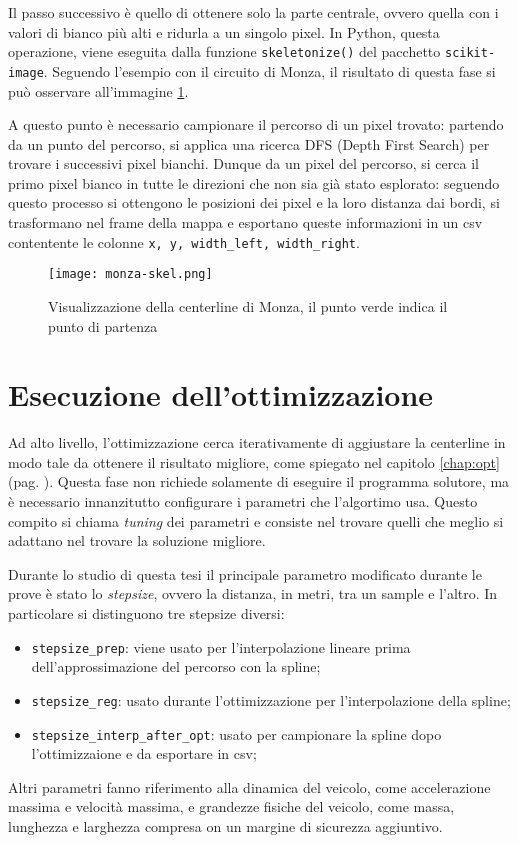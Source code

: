 Il passo successivo è quello di ottenere solo la parte centrale, ovvero quella con i valori di bianco
più alti e ridurla a un singolo pixel. In Python, questa operazione, viene eseguita dalla funzione
\verb|skeletonize()| del pacchetto \verb|scikit-image|. Seguendo l'esempio con il circuito di Monza, il
risultato di questa fase si può osservare all'immagine \ref{fig:monza-skel}.

A questo punto è necessario campionare il percorso di un pixel trovato: partendo da un punto del
percorso, si applica una ricerca DFS (Depth First Search) per trovare i successivi pixel bianchi. Dunque
da un pixel del percorso, si cerca il primo pixel bianco in tutte le direzioni che non sia già stato
esplorato: seguendo questo processo si ottengono le posizioni dei pixel e la loro distanza dai bordi, si
trasformano nel frame della mappa e esportano queste informazioni in un csv contentente le colonne
\verb|x, y, width_left, width_right|.

\begin{figure}[h]
	\begin{center}
		\texttt{[image: monza-skel.png]}
	\end{center}
	\caption{Visualizzazione della centerline di Monza, il punto verde indica il punto di partenza}\label{fig:monza-skel}
\end{figure}


\section{Esecuzione dell'ottimizzazione}
Ad alto livello, l'ottimizzazione cerca iterativamente di aggiustare la centerline in modo tale da
ottenere il risultato migliore, come spiegato nel capitolo \ref{chap:opt} (pag. \pageref{chap:opt}).
Questa fase non richiede solamente di eseguire il programma solutore, ma è necessario innanzitutto
configurare i parametri che l'algortimo usa. Questo compito si chiama \textit{tuning} dei parametri
e consiste nel trovare quelli che meglio si adattano nel trovare la soluzione migliore.

Durante lo studio di questa tesi il principale parametro modificato durante le prove è stato lo
\textit{stepsize}, ovvero la distanza, in metri, tra un sample e l'altro. In particolare si distinguono
tre stepsize diversi:
\begin{itemize}
	\item \verb|stepsize_prep|: viene usato per l'interpolazione lineare prima dell'approssimazione del
		percorso con la spline;
	\item \verb|stepsize_reg|: usato durante l'ottimizzazione per l'interpolazione della spline;
	\item \verb|stepsize_interp_after_opt|: usato per campionare la spline dopo l'ottimizzaione e da esportare in csv;
\end{itemize}

\noindent Altri parametri fanno riferimento alla dinamica del veicolo, come accelerazione massima e velocità
massima, e grandezze fisiche del veicolo, come massa, lunghezza e larghezza compresa on un margine di
sicurezza aggiuntivo.

